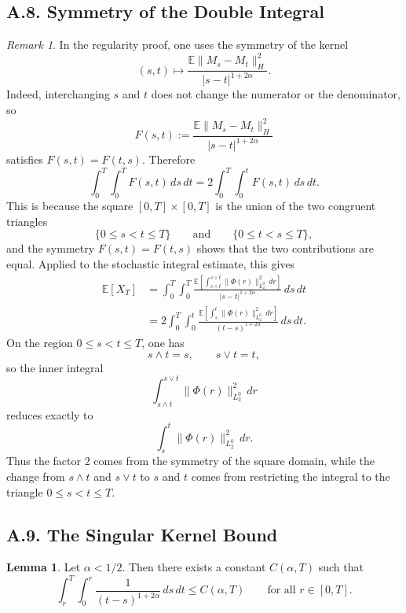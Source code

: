 \documentclass[11pt]{article}
\theoremstyle{definition}
\newtheorem{lemma}{Lemma}
\theoremstyle{remark}
\newtheorem{remark}{Remark}
\begin{document}
\subsection*{A.8. Symmetry of the Double Integral}
\begin{remark}
In the regularity proof, one uses the symmetry of the kernel
\[
(s,t)\mapsto \frac{\mathbb E\|M_s-M_t\|_H^2}{|s-t|^{1+2\alpha}}.
\]
Indeed, interchanging \(s\) and \(t\) does not change the numerator or the denominator, so
\[
F(s,t):=\frac{\mathbb E\|M_s-M_t\|_H^2}{|s-t|^{1+2\alpha}}
\]
satisfies \(F(s,t)=F(t,s)\). Therefore
\[
\int_0^T\int_0^T F(s,t)\,ds\,dt
=
2\int_0^T\int_0^t F(s,t)\,ds\,dt.
\]
This is because the square \([0,T]\times[0,T]\) is the union of the two congruent triangles
\[
\{0\le s<t\le T\}
\qquad\text{and}\qquad
\{0\le t<s\le T\},
\]
and the symmetry \(F(s,t)=F(t,s)\) shows that the two contributions are equal.
Applied to the stochastic integral estimate, this gives
\begin{align*}
\mathbb E[X_T]
&=
\int_0^T\int_0^T
\frac{\mathbb E\left[\int_{s\wedge t}^{s\vee t}\|\Phi(r)\|_{L_2^0}^2\,dr\right]}
{|s-t|^{1+2\alpha}}
\,ds\,dt \\
&=
2\int_0^T\int_0^t
\frac{\mathbb E\left[\int_s^t\|\Phi(r)\|_{L_2^0}^2\,dr\right]}
{(t-s)^{1+2\alpha}}
\,ds\,dt.
\end{align*}
On the region \(0\le s<t\le T\), one has
\[
s\wedge t=s,
\qquad
s\vee t=t,
\]
so the inner integral
\[
\int_{s\wedge t}^{s\vee t}\|\Phi(r)\|_{L_2^0}^2\,dr
\]
reduces exactly to
\[
\int_s^t\|\Phi(r)\|_{L_2^0}^2\,dr.
\]
Thus the factor \(2\) comes from the symmetry of the square domain, while the change from \(s\wedge t\) and \(s\vee t\) to \(s\) and \(t\) comes from restricting the integral to the triangle \(0\le s<t\le T\).
\end{remark}

\subsection*{A.9. The Singular Kernel Bound}
\begin{lemma}
Let \(\alpha<1/2\). Then there exists a constant \(C(\alpha,T)\) such that
\[
\int_r^T\int_0^r \frac{1}{(t-s)^{1+2\alpha}}\,ds\,dt
\le C(\alpha,T)
\qquad \text{for all } r\in[0,T].
\]
\end{lemma}
\end{document}
